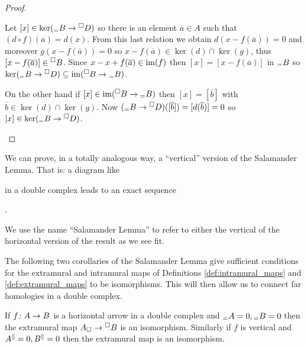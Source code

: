 \begin{proof}
\begin{enumerate}
    Let \([x]\in\ker({}_={B}\to{}^{\Box}{D})\) so there is an element \(\overline{a}\in A\) such that \((d\circ f)(\overline{a}) = d(x)\). From this last relation we obtain \(d(x - f(\overline{a})) = 0\) and moreover \(g(x - f(\overline{a})) = 0\) so \(x - f(\overline{a})\in\ker(d)\cap\ker(g)\), thus \([x - f(\overline{a})] \in{}^{\Box}{B}\). Since \(x - x + f(\overline{a})\in\operatorname{im}(f)\) then \([x] = [x - f(\overline{a})]\) in \({}_={B}\) so \(\ker({}_={B}\to{}^{\Box}{D})\subseteq\operatorname{im}({}^{\Box}{B}\to{}_={B})\).

    On the other hand if \([x]\in\operatorname{im}({}^{\Box}{B}\to{}_={B})\) then \([x] = [\overline{b}]\) with \(\overline{b}\in\ker(d)\cap\ker(g)\). Now \(({}_={B}\to{}^{\Box}{D})([\overline{b}]) = [d(\overline{b})] = 0\) so \([x]\in\ker({}_={B}\to{}^{\Box}{D})\).

  \end{enumerate}
\end{proof}

\begin{remark}
  \label{rem:other_salamander}
  We can prove, in a totally analogous way, a ``vertical'' version of the Salamander Lemma. That is: a diagram like
  \begin{center}
  \end{center}
  in a double complex leads to an exact sequence
  \begin{center}
    .
  \end{center}
  We use the name ``Salamander Lemma'' to refer to either the vertical of the horizontal version of the result as we see fit.
\end{remark}

The following two corollaries of the Salamander Lemma give sufficient conditions for the extramural and intramural maps of Definitions \ref{def:intramural_maps} and \ref{def:extramural_maps} to be isomorphisms. This will then allow us to connect far homologies in a double complex.

\begin{corollary}
  \label{coro:extramural_isomorphisms}
  If \(f\colon A\to B\) is a horizontal arrow in a double complex and \({}_={A}=0,{}_={B}=0\) then the extramural map \({A}_{\Box}\to{}^{\Box}{B}\) is an isomorphism. Similarly if \(f\) is vertical and \({A}^{\parallel}=0,{B}^{\parallel}=0\) then the extramural map is an isomorphism.
\end{corollary}

